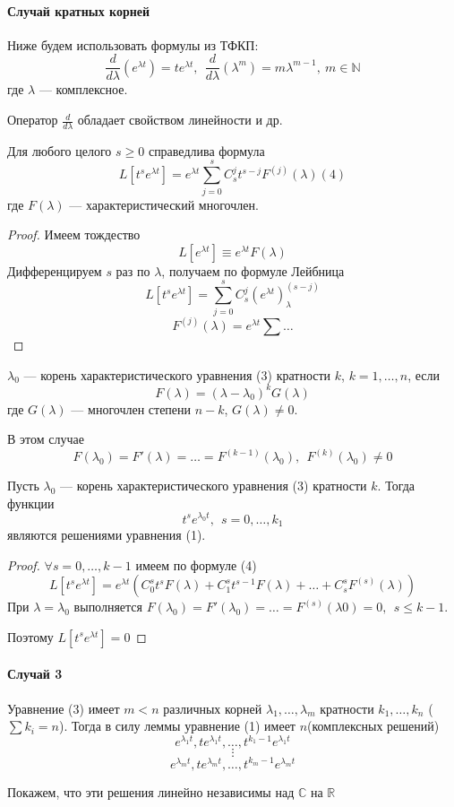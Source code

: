 \paragraph{Случай кратных корней}
Ниже будем использовать формулы из ТФКП:
\[ \frac{d}{d\lambda}(e^{\lambda t}) = t e^{\lambda t},~~ \frac{d}{d\lambda}(\lambda^m) = m\lambda^{m - 1},~ m \in \mathbb{N} \]
где $\lambda$ --- комплексное.

Оператор $\frac{d}{d \lambda}$ обладает свойством линейности и др.
\begin{ass}
Для любого целого $ s \geqslant 0 $ справедлива формула
\[ L[t^se^{\lambda t}] = e^{\lambda t}\sum\limits_{j = 0}^s C_s^j t^{s - j} F^{(j)}(\lambda) (4)\]
где $F(\lambda)$ --- характеристический многочлен.
\end{ass}
\begin{proof}
Имеем тождество
\[ L[e^{\lambda t}] \equiv e^{\lambda t}F(\lambda) \]
Дифференцируем $s$ раз по $\lambda$, получаем по формуле Лейбница
\[ L[t^s e^{\lambda t}] = \sum\limits_{j = 0}^s C_s^j (e^{\lambda t})^(s - j)_\lambda \]
\[ F^{(j)}(\lambda) = e^{\lambda t} \sum \ldots \]
\end{proof}
\begin{df}
$\lambda_0$ --- корень характеристического уравнения (3) кратности $k$, $k = 1, \ldots, n$, если
\[ F(\lambda) = (\lambda - \lambda_0)^kG(\lambda) \]
где $G(\lambda)$ --- многочлен степени $n - k$, $G(\lambda) \neq 0$.
\end{df}

В этом случае
\[ F(\lambda_0) = F'(\lambda) = \ldots = F^{(k - 1)} (\lambda_0),~~ F^{(k)}(\lambda_0) \neq 0 \]

\begin{lem}
Пусть $\lambda_0$ --- корень характеристического уравнения (3) кратности $k$. Тогда функции
\[ t^s e^{\lambda_0 t},~~ s = 0, \ldots, k _ 1 \]
являются решениями уравнения (1).
\end{lem}
\begin{proof}
$\forall s = 0, \ldots, k - 1$ имеем по формуле (4)
\[ L[t^se^{\lambda t}] = e^{\lambda t}(C_0^st^s F(\lambda) + C_1^st^{s - 1} F(\lambda) + \ldots + C_s^s F^{(s)}(\lambda)) \]
При $\lambda = \lambda_0$ выполняется $F(\lambda_0) = F'(\lambda_0) = \ldots = F^{(s)}(\lambda 0) = 0,~~ s \leqslant k - 1$.

Поэтому $L[t^se^{\lambda t}] = 0$
\end{proof}
\paragraph{Случай 3}
Уравнение (3) имеет $m < n$ различных корней $\lambda_1, \ldots, \lambda_m$ кратности $k_1, \ldots, k_n$ ($\sum k_i = n$). Тогда в силу леммы уравнение (1) имеет $n$(комплексных решений)
\[ e^{\lambda_1t}, te^{\lambda_1t}, \ldots, t^{k_1 - 1}e^{\lambda_1t} \]
\[ \vdots \]
\[ e^{\lambda_mt}, te^{\lambda_mt}, \ldots, t^{k_m - 1}e^{\lambda_mt} \]

Покажем, что эти решения линейно независимы над $\mathbb{C}$ на $\mathbb{R}$